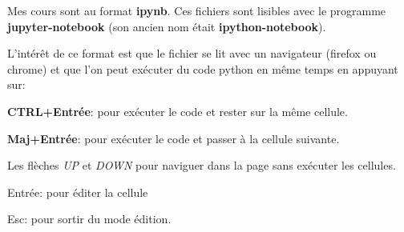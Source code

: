 \documentclass[10pt,dvipsnames,  dvips]{article}
\begin{document}
Mes cours sont au format \textbf{ipynb}. Ces fichiers sont lisibles avec le programme \textbf{jupyter-notebook} (son ancien nom était \textbf{ipython-notebook}).


L'intérêt de ce format est que le fichier se lit avec un navigateur (firefox ou chrome) et que l'on peut exécuter du code python en même temps en appuyant sur:

\begin{list}{}{}
\item \textbf{CTRL+Entrée}: pour exécuter le code et rester sur la même cellule.
\item \textbf{Maj+Entrée}: pour exécuter le code et passer à la cellule suivante.
\item Les flèches \textit{UP} et \textit{DOWN} pour naviguer dans la page sans exécuter les cellules.
\item Entrée:  pour éditer la cellule
\item Esc: pour sortir du mode édition.
\end{list}

\bigskip
\end{document}
